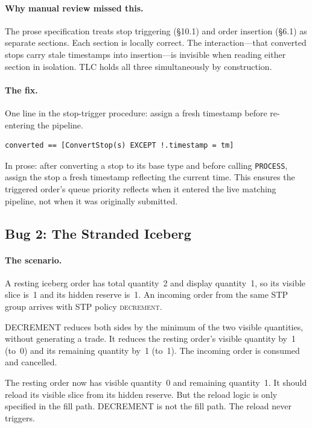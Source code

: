\documentclass[11pt,a4paper]{article}
\begin{document}
\paragraph{Why manual review missed this.} The prose specification
treats stop triggering (\S10.1) and order insertion (\S6.1) as separate
sections. Each section is locally correct. The interaction---that
converted stops carry stale timestamps into insertion---is invisible
when reading either section in isolation. TLC holds all three
simultaneously by construction.

\paragraph{The fix.} One line in the stop-trigger procedure: assign a
fresh timestamp before re-entering the pipeline.

\begin{lstlisting}[language=tlaplus]
converted == [ConvertStop(s) EXCEPT !.timestamp = tm]
\end{lstlisting}

In prose: after converting a stop to its base type and before calling
\texttt{PROCESS}, assign the stop a fresh timestamp reflecting the
current time. This ensures the triggered order's queue priority reflects
when it entered the live matching pipeline, not when it was originally
submitted.

\subsection{Bug 2: The Stranded Iceberg}
\label{sec:bug2}

\paragraph{The scenario.} A resting iceberg order has total quantity~2
and display quantity~1, so its visible slice is~1 and its hidden
reserve is~1. An incoming order from the same STP group arrives with
STP policy \textsc{decrement}.

DECREMENT reduces both sides by the minimum of the two visible
quantities, without generating a trade. It reduces the resting order's
visible quantity by~1 (to~0) and its remaining quantity by~1 (to~1).
The incoming order is consumed and cancelled.

The resting order now has visible quantity~0 and remaining quantity~1.
It should reload its visible slice from its hidden reserve. But the
reload logic is only specified in the fill path. DECREMENT is not the
fill path. The reload never triggers.
\end{document}
